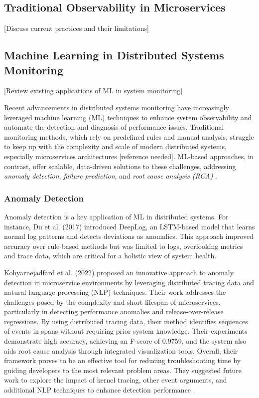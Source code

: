 \documentclass[10pt,journal,compsoc]{IEEEtran}
\begin{document}
\subsection{Traditional Observability in Microservices}
[Discuss current practices and their limitations]

\subsection{Machine Learning in Distributed Systems Monitoring}
[Review existing applications of ML in system monitoring]

Recent advancements in distributed systems monitoring have increasingly leveraged machine learning (ML) techniques to enhance system observability and automate the detection and diagnosis of performance issues. Traditional monitoring methods, which rely on predefined rules and manual analysis, struggle to keep up with the complexity and scale of modern distributed systems, especially microservices architectures [reference needed]. ML-based approaches, in contrast, offer scalable, data-driven solutions to these challenges, addressing \textit{anomaly detection}, \textit {failure prediction}, and \textit {root cause analysis (RCA)} \cite{need_reference}.

\subsubsection{Anomaly Detection}
Anomaly detection is a key application of ML in distributed systems. For instance, Du et al. (2017) \cite{du2017deeplog} introduced DeepLog, an LSTM-based model that learns normal log patterns and detects deviations as anomalies. This approach improved accuracy over rule-based methods but was limited to logs, overlooking metrics and trace data, which are critical for a holistic view of system health.

Kohyarnejadfard et al. (2022) proposed an innovative approach to anomaly detection in microservice environments by leveraging distributed tracing data and natural language processing (NLP) techniques. Their work addresses the challenges posed by the complexity and short lifespan of microservices, particularly in detecting performance anomalies and release-over-release regressions. By using distributed tracing data, their method identifies sequences of events in spans without requiring prior system knowledge. Their experiments demonstrate high accuracy, achieving an F-score of 0.9759, and the system also aids root cause analysis through integrated visualization tools. Overall, their framework proves to be an effective tool for reducing troubleshooting time by guiding developers to the most relevant problem areas. They suggested future work to explore the impact of kernel tracing, other event arguments, and additional NLP techniques to enhance detection performance \cite{kohyarnejadfard2022anomaly}.
\end{document}
